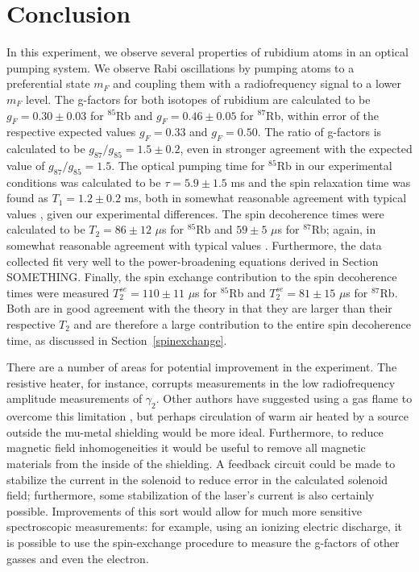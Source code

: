 
\section{Conclusion}\label{conclusion}

In this experiment, we observe several properties of rubidium atoms in an optical pumping system. We observe Rabi oscillations by pumping atoms to a preferential state $m_{F}$ and coupling them with a radiofrequency signal to a lower $m_{F}$ level. The g-factors for both isotopes of rubidium are calculated to be $g_{F}=0.30\pm0.03$ for $^{85}$Rb and $g_{F}=0.46\pm0.05$ for $^{87}$Rb, within error of the respective expected values $g_{F}=0.33$ and $g_{F}=0.50$. The ratio of g-factors is calculated to be $g_{87}/g_{85}=1.5\pm0.2$, even in stronger agreement with the expected value of $g_{87}/g_{85}=1.5$. The optical pumping time for $^{85}$Rb in our experimental conditions was calculated to be $\tau = 5.9\pm 1.5$ ms and the spin relaxation time was found as $T_{1}=1.2 \pm 0.2$ ms, both in somewhat reasonable agreement with typical values \cite{vanier}, given our experimental differences. The spin decoherence times were calculated to be $T_2 = 86 \pm 12$ $\mu$s for $^{85}$Rb and $59 \pm 5$ $\mu$s for $^{87}$Rb; again, in somewhat reasonable agreement with typical values \cite{vanier}. Furthermore, the data collected fit very well to the power-broadening equations derived in Section SOMETHING. Finally, the spin exchange contribution to the spin decoherence times were measured $T^{se}_2=110 \pm 11$ $\mu$s for  $^{85}$Rb and $T^{se}_2 = 81 \pm 15$ $\mu$s for  $^{87}$Rb. Both are in good agreement with the theory in that they are larger than their respective $T_{2}$ and are therefore a large contribution to the entire spin decoherence time, as discussed in Section~\ref{spinexchange}.

There are a number of areas for potential improvement in the experiment. The resistive heater, for instance, corrupts measurements in the low radiofrequency amplitude measurements of $\gamma_{2}$. Other authors have suggested using a gas flame to overcome this limitation \cite{benumof}, but perhaps circulation of warm air heated by a source outside the mu-metal shielding would be more ideal. Furthermore, to reduce magnetic field inhomogeneities it would be useful to remove all magnetic materials from the inside of the shielding. A feedback circuit could be made to stabilize the current in the solenoid to reduce error in the calculated solenoid field; furthermore, some stabilization of the laser's current is also certainly possible. Improvements of this sort would allow for much more sensitive spectroscopic measurements: for example, using an ionizing electric discharge, it is possible to use the spin-exchange procedure to measure the g-factors of other gasses and even the electron.